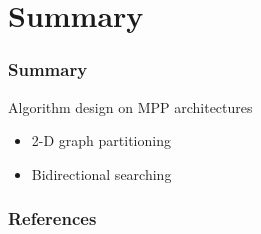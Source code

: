 \documentclass[]{beamer}
\begin{document}
\section{Summary}
\frame{\tableofcontents[currentsection]}

\begin{frame}
  \frametitle{Summary}
  Algorithm design on MPP architectures
  \begin{itemize}
    \item 2-D graph partitioning
    \item Bidirectional searching
  \end{itemize}
\end{frame}

\begin{frame}
  \frametitle{References}
  
  
\end{frame}

\end{document}
